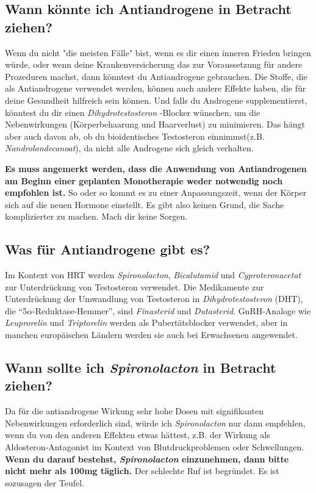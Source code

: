 \documentclass{article}
\begin{document}
\subsection{Wann könnte ich Antiandrogene in Betracht ziehen?}

Wenn du nicht "die meisten Fälle" bist, wenn es dir einen inneren Frieden bringen würde, oder wenn deine Krankenversicherung das zur Voraussetzung für andere Prozeduren machst, dann könntest du Antiandrogene gebrauchen. Die Stoffe, die als Antiandrogene verwendet werden, können auch andere Effekte haben, die für deine Gesundheit hilfreich sein können. Und falls du Androgene supplementierst, könntest du dir einen \textit{Dihydrotestosteron }-Blocker wünschen, um die Nebenwirkungen (Körperbehaarung und Haarverlust) zu minimieren. Das hängt aber auch davon ab, ob du bioidentisches Testosteron einnimmst(z.B. \textit{Nandrolondecanoat}), da nicht alle Androgene sich gleich verhalten.

\textbf{Es muss angemerkt werden, dass die Anwendung von Antiandrogenen am Beginn einer geplanten Monotherapie weder notwendig noch empfohlen ist.} So oder so kommt es zu einer Anpassungszeit, wenn der Körper sich auf die neuen Hormone einstellt. Es gibt also keinen Grund, die Sache komplizierter zu machen. Mach dir keine Sorgen.

\subsection{Was für Antiandrogene gibt es?}

Im Kontext von HRT werden \textit{Spironolacton}, \textit{Bicalutamid} und \textit{Cyproteronacetat} zur Unterdrückung von Testosteron verwendet. Die Medikamente zur Unterdrückung der Umwandlung von Testosteron in \textit{Dihydrotestosteron} (DHT), die “5$\alpha$-Reduktase-Hemmer”,  sind \textit{Finasterid} und \textit{Dutasterid}. GnRH-Analoge wie \textit{Leuprorelin} und \textit{Triptorelin} werden als Pubertätsblocker verwendet, aber in manchen europäischen Ländern werden sie auch bei Erwachsenen angewendet.

\subsection{Wann sollte ich \textit{Spironolacton} in Betracht ziehen?}

Da für die antiandrogene Wirkung sehr hohe Dosen mit signifikanten Nebenwirkungen erforderlich sind, würde ich \textit{Spironolacton} nur dann empfehlen, wenn du von den anderen Effekten etwas hättest, z.B. der Wirkung als  Aldosteron-Antagonist im Kontext von Blutdruckproblemen oder Schwellungen. \textbf{Wenn du darauf bestehst, \textit{Spironolacton} einzunehmen, dann bitte nicht mehr als 100mg täglich.} Der schlechte Ruf ist begründet. Es ist sozusagen der Teufel.
\end{document}
